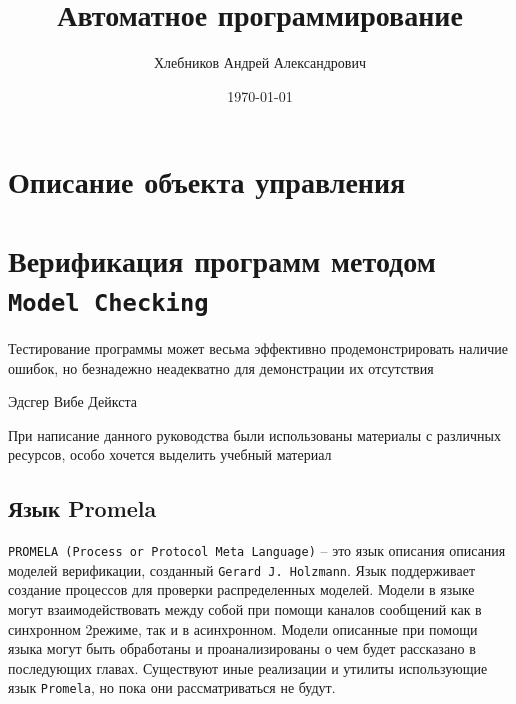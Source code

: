 \documentclass[12pt, twoside]{report}
\begin{document}
\pagestyle{empty}
\title{\textbf{Автоматное программирование}}
\author{Хлебников Андрей Александрович}
\date{\today}

\maketitle
\pagestyle{empty}
\newpage
\renewcommand{\cftchapdotsep}{\cftdotsep}
\tableofcontents
\newpage
\pagestyle{fancy}
\fancyhf{}
\lhead[]{\thepage}
\rhead[\thepage]{}

\singlespacing
\chapter*{Описание объекта управления}


\chapter*{Верификация программ методом \texttt{Model Checking}}

\epigraph{Тестирование программы может весьма эффективно продемонстрировать наличие ошибок, но безнадежно неадекватно для демонстрации их отсутствия}{Эдсгер Вибе Дейкста}

При написание данного руководства были использованы материалы с различных ресурсов,
особо хочется выделить учебный материал \cite{Alessandra:2014}
\section*{Язык Promela}\label{promela_LANGUAGE}
\texttt{PROMELA (Process or Protocol Meta Language)} -- это язык описания описания моделей верификации,
созданный \texttt{Gerard J. Holzmann}\cite{Promela:Wiki}. Язык поддерживает создание процессов
для проверки распределенных моделей. Модели в языке могут взаимодействовать между собой при помощи
каналов сообщений как в синхронном 2режиме, так и в асинхронном. Модели описанные при помощи языка
могут быть обработаны и проанализированы  о чем будет рассказано в последующих главах.
Существуют иные реализации и утилиты использующие язык \texttt{Promela}, но пока они рассматриваться не будут.
\end{document}
